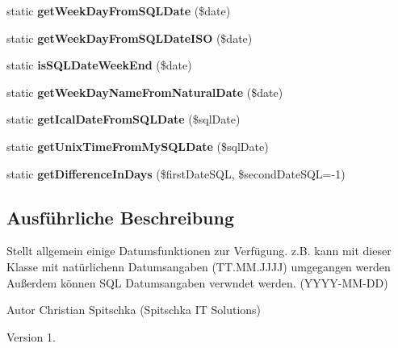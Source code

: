 \begin{DoxyCompactItemize}
\mbox{\label{class_date_functions_a735fcf7402db8323ed6c45ff3dcabc7d}} 
static {\bfseries get\+Week\+Day\+From\+S\+Q\+L\+Date} (\$date)
\item 
\mbox{\label{class_date_functions_acac93a3e87952c1ae1f9fe9a03e8358e}} 
static {\bfseries get\+Week\+Day\+From\+S\+Q\+L\+Date\+I\+SO} (\$date)
\item 
\mbox{\label{class_date_functions_a9b593a8361b3d071cf1f0f9dd4db4229}} 
static {\bfseries is\+S\+Q\+L\+Date\+Week\+End} (\$date)
\item 
\mbox{\label{class_date_functions_a3448f4660d97e9a1185d61fbc949b134}} 
static {\bfseries get\+Week\+Day\+Name\+From\+Natural\+Date} (\$date)
\item 
\mbox{\label{class_date_functions_a7dca9f1138cc0a696c17fbef3a3054bb}} 
static {\bfseries get\+Ical\+Date\+From\+S\+Q\+L\+Date} (\$sql\+Date)
\item 
\mbox{\label{class_date_functions_a9ab43262f4b8ff3ae9be52c29d63a440}} 
static {\bfseries get\+Unix\+Time\+From\+My\+S\+Q\+L\+Date} (\$sql\+Date)
\item 
\mbox{\label{class_date_functions_a09c9789d8a66a7803071ff1b20731841}} 
static {\bfseries get\+Difference\+In\+Days} (\$first\+Date\+S\+QL, \$second\+Date\+S\+QL=-\/1)
\end{DoxyCompactItemize}


\subsection{Ausführliche Beschreibung}
Stellt allgemein einige Datumsfunktionen zur Verfügung. z.\+B. kann mit dieser Klasse mit natürlichenn Datumsangaben (T\+T.\+M\+M.\+J\+J\+JJ) umgegangen werden Außerdem können S\+QL Datumsangaben verwndet werden. (Y\+Y\+Y\+Y-\/\+M\+M-\/\+DD) \begin{DoxyAuthor}{Autor}
Christian Spitschka (Spitschka IT Solutions) 
\end{DoxyAuthor}
\begin{DoxyVersion}{Version}
1. 
\end{DoxyVersion}



